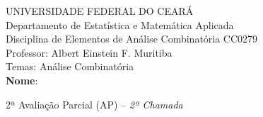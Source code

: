 \documentclass[a4paper,12pt]{letter}  %
\begin{document}
\thispagestyle{empty}

UNIVERSIDADE FEDERAL DO CEARÁ\\
Departamento de Estatística e Matemática Aplicada\\
Disciplina de Elementos de Análise Combinatória CC0279\\
Professor: Albert Einstein F. Muritiba\\
Temas: Análise Combinatória\\[0.2cm]
\textbf{Nome}: \makebox[380pt]{\hrulefill} \vspace{2pt}
\begin{center}
	2ª Avaliação Parcial (AP)
	-- \textit{2ª Chamada}
\end{center}
\end{document}
